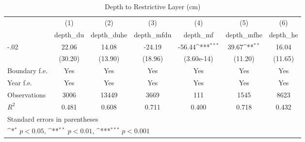\begin{table}[htbp]\centering
\def\sym#1{\ifmmode^{#1}\else\(^{#1}\)\fi}
\caption{Depth to Restrictive Layer (cm)}
\begin{tabular}{l*{6}{c}}
\hline\hline
                    &\multicolumn{1}{c}{(1)}&\multicolumn{1}{c}{(2)}&\multicolumn{1}{c}{(3)}&\multicolumn{1}{c}{(4)}&\multicolumn{1}{c}{(5)}&\multicolumn{1}{c}{(6)}\\
                    &\multicolumn{1}{c}{depth\_du}&\multicolumn{1}{c}{depth\_duhe}&\multicolumn{1}{c}{depth\_mfdu}&\multicolumn{1}{c}{depth\_mf}&\multicolumn{1}{c}{depth\_mfhe}&\multicolumn{1}{c}{depth\_he}\\
\hline
-.02                &       22.06         &       14.08         &      -24.19         &      -56.44\sym{***}&       39.67\sym{**} &       16.04         \\
                    &     (30.20)         &     (13.90)         &     (18.96)         &  (3.60e-14)         &     (11.20)         &     (11.65)         \\
[1em]
Boundary f.e.       &         Yes         &         Yes         &         Yes         &         Yes         &         Yes         &         Yes         \\
[1em]
Year f.e.           &         Yes         &         Yes         &         Yes         &         Yes         &         Yes         &         Yes         \\
\hline
Observations        &        3006         &       13449         &        3669         &         111         &        1545         &        8623         \\
\(R^{2}\)           &       0.481         &       0.608         &       0.711         &       0.400         &       0.718         &       0.432         \\
\hline\hline
\multicolumn{7}{l}{\footnotesize Standard errors in parentheses}\\
\multicolumn{7}{l}{\footnotesize \sym{*} \(p<0.05\), \sym{**} \(p<0.01\), \sym{***} \(p<0.001\)}\\
\end{tabular}
\end{table}
